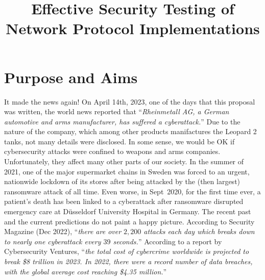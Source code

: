 \documentclass[11pt]{article}
\begin{document}
\title{\bf Effective Security Testing of Network Protocol Implementations}
\author{}
\date{}

\maketitle
\thispagestyle{plain}


\vspace*{-1.75em}

\section{Purpose and Aims}
It made the news again! On April 14th, 2023, one of the days that this
proposal was written, the world news reported that ``\textit{Rheinmetall
  AG, a German automotive and arms manufacturer, has suffered a
  cyberattack.}'' Due to the nature of the company, which among other products
manifactures the Leopard 2 tanks, not many details were disclosed. In
some sense, we would be OK if cybersecurity attacks were confined to weapons
and arms companies. Unfortunately, they affect many other parts of our
society. In the summer of 2021, one of the major supermarket chains in Sweden
was forced to an urgent, nationwide lockdown of its stores after being
attacked by the (then largest) ransomware attack of all time. Even worse, in
Sept~2020, for the first time ever, a patient’s death has been linked to a
cyberattack after ransomware disrupted emergency care at Düsseldorf University
Hospital in Germany.
%
The recent past and the current predictions do not paint a happy picture.
According to Security Magazine (Dec 2022), ``\textit{there are over $2,200$
attacks each day which breaks down to nearly one cyberattack every $39$ seconds.}''
%
According to a report by Cybersecurity Ventures, ``\textit{the total cost of
  cybercrime worldwide is projected to break \$8 trillion in 2023.
  In 2022, there were a record number of data breaches, with the
  global \emph{average} cost reaching \$4.35 million.}''
\end{document}
